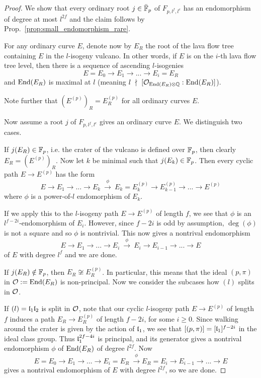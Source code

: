 \begin{proof}
    We show that every ordinary root $j \in \bar{\mathbb{F}}_p$ of $F_{p, l^f, l^e}$ has an endomorphism of degree at most $l^{2f}$ and the claim follows by Prop.~\ref{prop:small_endomorphism_rare}.

    For any ordinary curve $E$, denote now by $E_R$ the root of the lava flow tree containing $E$ in the $l$-isogeny vulcano.
    In other words, if $E$ is on the $i$-th lava flow tree level, then there is a sequence of ascending $l$-isogenies
    \begin{equation*}
        E = E_0 \to E_1 \to ... \to E_i = E_R
    \end{equation*}
    and $\mathrm{End}(E_R)$ is maximal at $l$ (meaning $l \ \nmid \  [\mathcal{O}_{\mathrm{End}(E_R) \otimes \mathbb{Q}} : \mathrm{End}(E_R)]$).

    Note further that $(E^{(p)})_R = E_R^{(p)}$ for all ordinary curves $E$.

    Now assume a root $j$ of $F_{p, l^f, l^e}$ gives an ordinary curve $E$.
    We distinguish two cases.

    If $j(E_R) \in \mathbb{F}_p$, i.e. the crater of the vulcano is defined over $\mathbb{F}_p$, then clearly $E_R = (E^{(p)})_R$.
    Now let $k$ be minimal such that $j(E_k) \in \mathbb{F}_p$.
    Then every cyclic path $E \to E^{(p)}$ has the form
    \begin{equation*}
        E \to E_1 \to ... \to E_k \ \overset{\phi}{\longrightarrow} \ E_k = E_k^{(p)} \to E_{k - 1}^{(p)} \to ... \to E^{(p)}
    \end{equation*}
    where $\phi$ is a power-of-$l$ endomorphism of $E_k$.

    If we apply this to the $l$-isogeny path $E \to E^{(p)}$ of length $f$, we see that $\phi$ is an $l^{f - 2i}$-endomorphism of $E_i$.
    However, since $f - 2i$ is odd by assumption, $\deg(\phi)$ is not a square and so $\phi$ is nontrivial.
    This now gives a nontrival endomorphism
    \begin{equation*}
        E \to E_1 \to ... \to E_i \ \overset{\phi}{\longrightarrow} \ E_i \to E_{i - 1} \to ... \to E
    \end{equation*}
    of $E$ with degree $l^f$ and we are done.

    If $j(E_R) \notin \mathbb{F}_p$, then $E_R \not\cong E^{(p)}_R$.
    In particular, this means that the ideal $(p, \pi)$ in $\mathcal{O} := \mathrm{End}(E_R)$ is non-principal.
    Now we consider the subcases how $(l)$ splits in $\mathcal{O}$.

    If $(l) = \mathfrak{l}_1 \mathfrak{l}_2$ is split in $\mathcal{O}$, note that our cyclic $l$-isogeny path $E \to E^{(p)}$ of length $f$ induces a path $E_R \to E_R^{(p)}$ of length $f - 2i$, for some $i \geq 0$.
    Since walking around the crater is given by the action of $\mathfrak{l}_1$, we see that $[(p, \pi)] = [\mathfrak{l}_1]^{f - 2i}$ in the ideal class group.
    Thus $\mathfrak{l}_1^{2f - 4i}$ is principal, and its generator gives a nontrival endomorphism $\phi$ of $\mathrm{End}(E_R)$ of degree $l^{2f}$.
    Now
    \begin{equation*}
        E = E_0 \to E_1 \to ... \to E_i = E_R \ \overset{\phi}{\longrightarrow} E_R = E_i \to E_{i - 1} \to ... \to E
    \end{equation*}
    gives a nontrival endomorphism of $E$ with degree $l^{2f}$, so we are done.


\end{proof}
